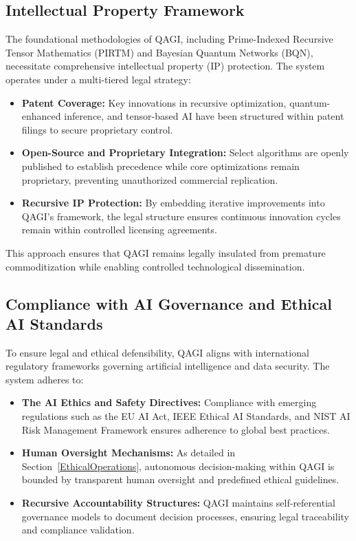 \documentclass{article}
\theoremstyle{plain}
\theoremstyle{claimstyle}
\begin{document}
\subsection{Intellectual Property Framework}

The foundational methodologies of QAGI, including Prime-Indexed Recursive Tensor Mathematics (PIRTM) and Bayesian Quantum Networks (BQN), necessitate comprehensive intellectual property (IP) protection. The system operates under a multi-tiered legal strategy:
\begin{itemize}
    \item \textbf{Patent Coverage:} Key innovations in recursive optimization, quantum-enhanced inference, and tensor-based AI have been structured within patent filings to secure proprietary control.
    \item \textbf{Open-Source and Proprietary Integration:} Select algorithms are openly published to establish precedence while core optimizations remain proprietary, preventing unauthorized commercial replication.
    \item \textbf{Recursive IP Protection:} By embedding iterative improvements into QAGI’s framework, the legal structure ensures continuous innovation cycles remain within controlled licensing agreements.
\end{itemize}

This approach ensures that QAGI remains legally insulated from premature commoditization while enabling controlled technological dissemination.

\subsection{Compliance with AI Governance and Ethical AI Standards}

To ensure legal and ethical defensibility, QAGI aligns with international regulatory frameworks governing artificial intelligence and data security. The system adheres to:
\begin{itemize}
    \item \textbf{The AI Ethics and Safety Directives:} Compliance with emerging regulations such as the EU AI Act, IEEE Ethical AI Standards, and NIST AI Risk Management Framework ensures adherence to global best practices.
    \item \textbf{Human Oversight Mechanisms:} As detailed in Section~\ref{EthicalOperations}, autonomous decision-making within QAGI is bounded by transparent human oversight and predefined ethical guidelines.
    \item \textbf{Recursive Accountability Structures:} QAGI maintains self-referential governance models to document decision processes, ensuring legal traceability and compliance validation.
\end{itemize}
\end{document}
